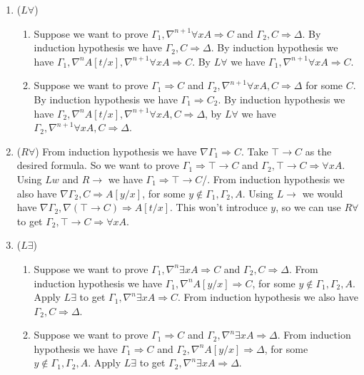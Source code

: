 \documentclass[a4paper, 12pt]{paper}
\begin{document}
\begin{enumerate}
  \item ($L \forall$) \quad \begin{enumerate}
      \item Suppose we want to prove $\Gamma_1, \nabla^{n+1} \forall x A \Rightarrow C$ and $\Gamma_2, C \Rightarrow \Delta$. By induction hypothesis we have $\Gamma_2, C \Rightarrow \Delta$. By induction hypothesis we have $\Gamma_1, \nabla^n A[t / x], \nabla^{n+1} \forall x A \Rightarrow C$. By $L \forall$ we have $\Gamma_1, \nabla^{n+1} \forall x A \Rightarrow C$.
      
      \item Suppose we want to prove $\Gamma_1 \Rightarrow C$ and $\Gamma_2, \nabla^{n+1} \forall x A, C \Rightarrow \Delta$ for some $C$. By induction hypothesis we have $\Gamma_1 \Rightarrow C_2$. By induction hypothesis we have $\Gamma_2, \nabla^n A[t / x], \nabla^{n+1} \forall x A, C \Rightarrow \Delta$, by $L \forall$ we have $\Gamma_2, \nabla^{n+1} \forall x A, C \Rightarrow \Delta$.
    \end{enumerate}
    
    \item ($R \forall$) From induction hypothesis we have $\nabla \Gamma_1 \Rightarrow C$. Take $\top \rightarrow C$ as the desired formula. So we want to prove $\Gamma_1 \Rightarrow \top \rightarrow C$ and $\Gamma_2, \top \rightarrow C \Rightarrow \forall x A$. Using $Lw$ and $R \rightarrow$ we have $\Gamma_1 \Rightarrow \top \rightarrow C$/. From induction hypothesis we also have $\nabla \Gamma_2, C \Rightarrow A[y / x]$, for some $y \not \in \Gamma_1, \Gamma_2, A$. Using $L \rightarrow$ we would have $\nabla \Gamma_2, \nabla (\top \rightarrow C) \Rightarrow A[t / x]$. This won't introduce $y$, so we can use $R \forall$ to get $\Gamma_2, \top \rightarrow C \Rightarrow \forall x A$.
    
    \item ($L \exists$) \begin{enumerate}
      \item Suppose we want to prove $\Gamma_1, \nabla^n \exists x A \Rightarrow C$ and $\Gamma_2, C \Rightarrow \Delta$. From induction hypothesis we have $\Gamma_1, \nabla^n A[y / x] \Rightarrow C$, for some $y \not \in \Gamma_1, \Gamma_2, A$. Apply $L \exists$ to get $\Gamma_1, \nabla^n \exists x A \Rightarrow C$. From induction hypothesis we also have $\Gamma_2, C \Rightarrow \Delta$.
      
      \item Suppose we want to prove $\Gamma_1 \Rightarrow C$ and $\Gamma_2, \nabla^n \exists x A \Rightarrow \Delta$. From induction hypothesis we have $\Gamma_1 \Rightarrow C$ and $\Gamma_2, \nabla^n A[y / x] \Rightarrow \Delta$, for some $y \not \in \Gamma_1, \Gamma_2, A$. Apply $L \exists$ to get $\Gamma_2, \nabla^n \exists x A \Rightarrow \Delta$.
    \end{enumerate}


\end{enumerate}
\end{document}
